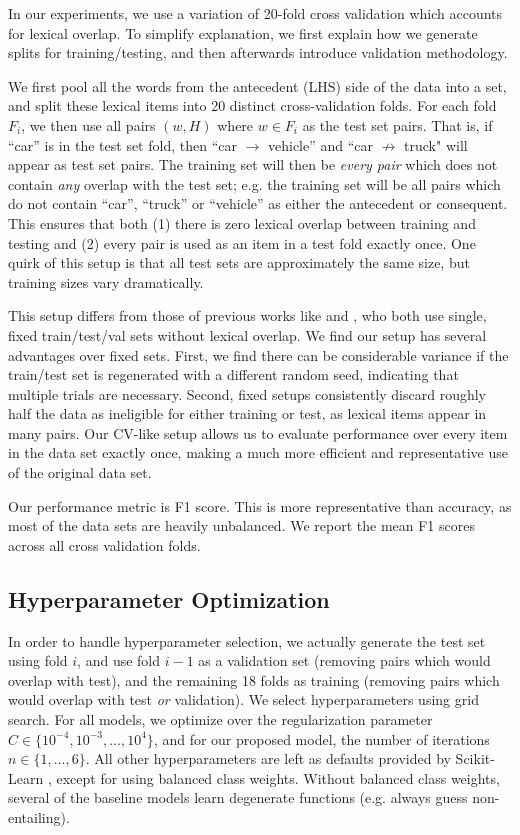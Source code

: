 In our experiments, we use a variation of 20-fold cross validation which
accounts for lexical overlap. To simplify explanation, we first explain how we
generate splits for training/testing, and then afterwards introduce validation
methodology.

We first pool all the words from the antecedent (LHS)
side of the data into a set, and split these lexical items into 20 distinct
cross-validation folds. For each fold $F_i$, we then use all pairs $(w, H)$ where
$w\in F_i$ as the test set pairs. That is, if ``car'' is in the test set fold,
then ``car $\rightarrow$ vehicle'' and ``car $\nrightarrow$ truck" will appear
as test set pairs. The training set will then be {\em every pair} which does
not contain {\em any} overlap with the test set; e.g. the training
set will be all pairs which do not contain ``car'', ``truck'' or ``vehicle''
as either the antecedent or consequent. This ensures that both (1) there
is zero lexical overlap between training and testing and (2) every pair is
used as an item in a test fold exactly once. One quirk of this setup is
that all test sets are approximately the same size, but training sizes
vary dramatically.

This setup differs from those of previous works like
 and , who both use
single, fixed train/test/val sets without lexical overlap. We find our setup
has several advantages over fixed sets. First, we find there can be
considerable variance if the train/test set is regenerated with a different
random seed, indicating that multiple trials are necessary. Second, fixed
setups consistently discard roughly half the data as ineligible for either
training or test, as lexical items appear in many pairs. Our CV-like setup
allows us to evaluate performance over every item in the data set exactly once,
making a much more efficient and representative use of the original data set.

Our performance metric is F1 score. This is more representative than
accuracy, as most of the data sets are heavily unbalanced. We report the mean
F1 scores across all cross validation folds.

\subsection{Hyperparameter Optimization}

In order to handle hyperparameter selection, we actually generate the test set
using fold $i$, and use fold $i-1$ as a validation set (removing pairs which
would overlap with test), and the remaining 18 folds as training (removing
pairs which would overlap with test {\em or} validation). We select
hyperparameters using grid search. For all models, we optimize over the regularization parameter
$C \in \{10^{-4}, 10^{-3}, \ldots, 10^4\}$, and for our proposed model, the
number of iterations $n \in \{1, \ldots, 6\}$. All other hyperparameters
are left as defaults provided by Scikit-Learn \cite{pedregosa:2013:jmlr},
except for using balanced class weights. Without balanced class weights,
several of the baseline models learn degenerate functions (e.g. always guess non-entailing).

